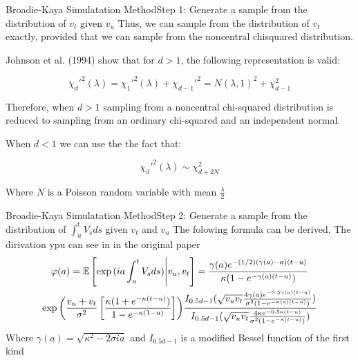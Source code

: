 \begin{frame}{Broadie-Kaya Simulatation Method}{Step 1: Generate a sample from the distribution of $v_t$ given $v_u$}
    Thus, we can sample from the distribution of $v_t$ exactly,
    provided that we can sample from the noncentral chisquared distribution.

    Johnson et al. (1994) show that for $d > 1$, the following representation is valid:


    \begin{equation}
        \chi_d'^{2}(\lambda) = \chi_1'^{2}(\lambda) + \chi_{d-1}'^{2} = N(\lambda, 1)^2 + \chi_{d-1}^{2}
    \end{equation}

    Therefore,  when $d > 1$ sampling from a noncentral chi-squared distribution
    is reduced to sampling from an ordinary chi-squared and
    an independent normal.

    When $d < 1$ we can use the the fact that:

    \begin{equation}
        \chi_d'^{2}(\lambda) \sim \chi_{d + 2N}^{2}
    \end{equation}

    Where $N$ is a Poisson random variable with mean $\frac{\lambda}{2}$

    
\end{frame}

\begin{frame}{Broadie-Kaya Simulatation Method}{Step 2:  Generate a sample from the distribution of $\int_{u}^t V_s ds$ given $v_t$ and $v_u$}
    The folowing formula can be derived. The dirivation ypu can see in in the original paper
    \begin{multline}
        \varphi(a) = \mathbb{E}\left[  \exp{(ia\int_{u}^t V_s ds)} \Bigg| v_u, v_t\right] = \frac{\gamma(a)e^{-(1/2)(\gamma(a) - \kappa)(t - u)}}{\kappa(1-e^{-\gamma(a)(t-u)})} \\
        \exp{\left(\frac{v_u + v_t}{\sigma^2} \left[  \frac{\kappa(1+e^{-\kappa(t-u)})}{1-e^{-\kappa(1-u)}}                 \right]     \right)}
        \frac{I_{0.5d-1}(\sqrt{v_uv_t}\frac{4\gamma(a)e^{-0.5\gamma(a)(t-u)}}{\sigma^2(1-e^{-\kappa(a)(t-u)})})}{I_{0.5d-1}(\sqrt{v_uv_t}\frac{4\kappa e^{-0.5\kappa(t-u)}}{\sigma^2(1-e^{-\kappa(t-u)})})}
    \end{multline}
    Where $\gamma(a) = \sqrt{\kappa^2 - 2\sigma i a}$ and $I_{0.5d-1}$ is a modified  Bessel function of the first kind

\end{frame}



